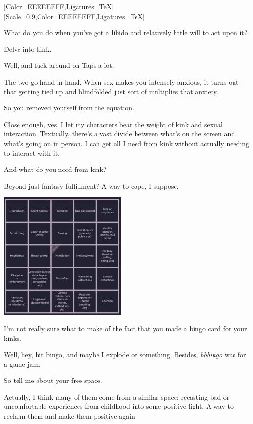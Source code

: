 \label{sex:kink}
[Color=EEEEEEFF,Ligatures=TeX]
\renewfontfamily{}[Scale=0.9,Color=EEEEEEFF,Ligatures=TeX]

\noindent What do you do when you've got a libido and relatively little will to act upon it?

Delve into kink.

\begin{ally}
Well, and fuck around on Taps a lot.
\end{ally}
The two go hand in hand. When sex makes you intensely anxious, it turns out that getting tied up and blindfolded just sort of multiplies that anxiety.

\begin{ally}
So you removed yourself from the equation.
\end{ally}
Close enough, yes. I let my characters bear the weight of kink and sexual interaction. Textually, there's a vast divide between what's on the screen and what's going on in person. I can get all I need from kink without actually needing to interact with it.

\begin{ally}
And what do you need from kink?
\end{ally}
Beyond just fantasy fulfillment? A way to cope, I suppose.

\noindent\includegraphics[width=2.5in]{assets/static/sex/kink/bingo.png}

\begin{ally}
I'm not really sure what to make of the fact that you made a bingo card for your kinks.
\end{ally}
Well, hey, hit bingo, and maybe I explode or something. Besides, \emph{bbbingo} was for a game jam.

\begin{ally}
So tell me about your free space.
\end{ally}
Actually, I think many of them come from a similar space: recasting bad or uncomfortable experiences from childhood into some positive light. A way to reclaim them and make them positive again.

